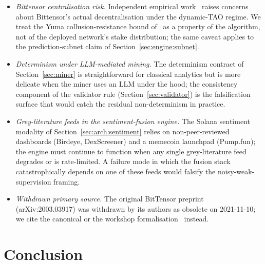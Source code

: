 \documentclass[11pt,a4paper]{article}
\begin{document}
\begin{itemize}
{        cohort.} The honest accuracy number is the 53.15\% live-API baseline
        on the broader cohort~\cite{omnirisk2026systemdesign}. The smallest
        experiment that would falsify the broad-cohort claim is to expand the
        outcome-resolver corpus and re-run the 168-hour evaluation; the
        hypothesis would be falsified if the broad-cohort calibration error
        exceeds 0.20.
  \item \emph{Bittensor centralisation risk.} Independent empirical
        work~\cite{lui2025bittensor} raises concerns about Bittensor's actual
        decentralisation under the dynamic-TAO regime. We treat the Yuma
        collusion-resistance bound of~\cite{steeves2022incentivizing} as a
        property of the algorithm, not of the deployed network's stake
        distribution; the same caveat applies to the prediction-subnet claim
        of Section~\ref{sec:engine:subnet}.
  \item \emph{Determinism under LLM-mediated mining.} The determinism contract
        of Section~\ref{sec:miner} is straightforward for classical analytics
        but is more delicate when the miner uses an LLM under the hood; the
        consistency component of the validator rule
        (Section~\ref{sec:validator}) is the falsification surface that would
        catch the residual non-determinism in practice.
  \item \emph{Grey-literature feeds in the sentiment-fusion engine.} The
        Solana sentiment modality of Section~\ref{sec:arch:sentiment} relies
        on non-peer-reviewed dashboards (Birdeye, DexScreener) and a memecoin
        launchpad (Pump.fun); the engine must continue to function when any
        single grey-literature feed degrades or is rate-limited. A failure
        mode in which the fusion stack catastrophically depends on one of
        these feeds would falsify the noisy-weak-supervision framing.
  \item \emph{Withdrawn primary source.} The original BitTensor preprint
        (arXiv:2003.03917) was withdrawn by its authors as obsolete on
        2021-11-10; we cite the canonical \cite{rao2021bittensor} or the
        workshop formalisation~\cite{steeves2022incentivizing} instead.
\end{itemize}

\section{Conclusion}\label{sec:conclusion}
\end{document}

